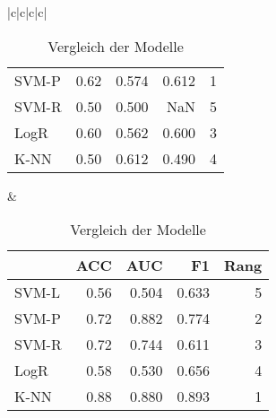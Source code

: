 \documentclass[
]{article}
\begin{document}
\begin{landscape}
\begin{table}[h]
\begin{center}
\begin{tabular}{|c|c|c|c|}
\begin{tabular}{lrrrr}
SVM-P & 0.62 & 0.574 & 0.612 & 1\\
SVM-R & 0.50 & 0.500 & NaN & 5\\
LogR & 0.60 & 0.562 & 0.600 & 3\\
K-NN & 0.50 & 0.612 & 0.490 & 4\\
\bottomrule
\end{tabular}  &  
\begin{tabular}{lrrrr}
\toprule
  & ACC & AUC & F1 & Rang\\
\midrule
SVM-L & 0.56 & 0.504 & 0.633 & 5\\
SVM-P & 0.72 & 0.882 & 0.774 & 2\\
SVM-R & 0.72 & 0.744 & 0.611 & 3\\
LogR & 0.58 & 0.530 & 0.656 & 4\\
K-NN & 0.88 & 0.880 & 0.893 & 1\\
\bottomrule
\end{tabular}  \\ \hline \end{tabular} \end{center} \caption{Vergleich der Modelle} \end{table}

\end{landscape}

\printbibliography
\end{document}
